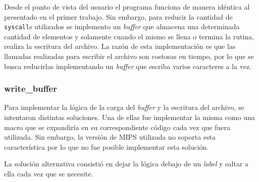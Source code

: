 \documentclass[10pt,a4paper]{article}
\begin{document}
Desde el punto de vista del usuario el programa funciona de manera idéntica al presentado en el primer trabajo. Sin embargo, para reducir la cantidad de \texttt{syscall}s utilizados se implemento un \textit{buffer} que almacena una determinada cantidad de elementos y solamente cuando el mismo se llena o termina la rutina, realiza la escritura del archivo. La razón de esta implementación es que las llamadas realizadas para escribir el archivo son costosas en tiempo, por lo que se busca reducirlas implementando un \textit{buffer} que escriba varios caracteres a la vez.

\subsubsection{write\_buffer}
Para implementar la lógica de la carga del \textit{buffer} y la escritura del archivo, se intentaron distintas soluciones. Una de ellas fue implementar la misma como una macro que se expandiría en su correspondiente código cada vez que fuera utilizada. Sin embargo, la versión de MIPS utilizada no soporta esta característica por lo que no fue posible implementar esta solución.

La solución alternativa consistió en dejar la lógica debajo de un \textit{label} y saltar a ella cada vez que se necesite.
\end{document}
